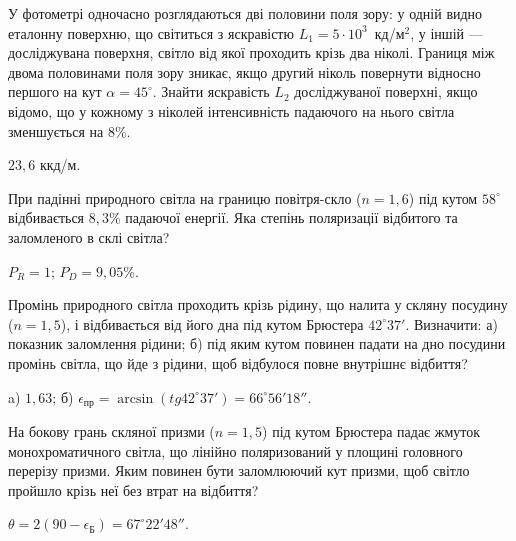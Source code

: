 \begin{problem}%
    У фотометрі одночасно розглядаються дві половини поля зору: у одній видно еталонну поверхню, що світиться з яскравістю $ L_1 = 5\cdot10^3 $~кд/м$^2$, у іншій --- досліджувана поверхня, світло від якої проходить крізь два ніколі. Границя між двома половинами поля зору зникає, якщо другий ніколь повернути відносно першого на кут $ \alpha = 45^\circ $. Знайти яскравість $ L_2 $ досліджуваної поверхні, якщо відомо, що у кожному з ніколей інтенсивність падаючого на нього світла зменшується на $ 8 $\%.
    \begin{solution}
        $ 23,6 $ ккд/м.
    \end{solution}
\end{problem}


\begin{problem}%
    При падінні природного світла на границю повітря-скло ($ n = 1,6 $) під кутом $ 58^\circ $ відбивається $ 8,3 $\% падаючої енергії. Яка степінь поляризації відбитого та заломленого в склі світла?
    \begin{solution}
        $ P_R = 1$; $P_D = 9,05\% $.
    \end{solution}
\end{problem}


\begin{problem}%
    Промінь природного світла проходить крізь рідину, що налита у скляну посудину ($ n = 1,5 $), і відбивається від його дна під кутом Брюстера $ 42^\circ37' $. Визначити: а) показник заломлення рідини; б) під яким кутом повинен падати на дно посудини промінь світла, що йде з рідини, щоб відбулося повне внутрішнє відбиття?
    \begin{solution}
        a) $ 1,63 $; б) $ \epsilon_\text{пр} = \arcsin(tg42^\circ37') = 66^\circ56'18'' $.
    \end{solution}
\end{problem}


\begin{problem}%
     На бокову грань скляної призми ($ n = 1,5 $) під кутом Брюстера падає жмуток монохроматичного світла, що лінійно поляризований у площині головного перерізу призми. Яким повинен бути заломлюючий кут призми, щоб світло пройшло крізь неї без втрат на відбиття?
    \begin{solution}
        $ \theta = 2(90 - \epsilon_\text{Б}) = 67^\circ22'48'' $.
    \end{solution}
\end{problem}



